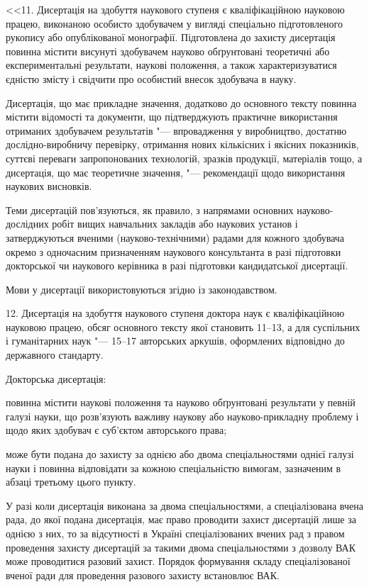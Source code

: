 \documentclass[
]{mon2017dev-aref}[2019/11/16]
\theoremstyle{plain}
\theoremstyle{definition}
\theoremstyle{remark}
\begin{document}
<<11. Дисертація на здобуття наукового ступеня є кваліфікаційною
науковою працею, виконаною особисто здобувачем у вигляді
спеціально підготовленого рукопису або опублікованої монографії.
Підготовлена до захисту дисертація повинна містити висунуті
здобувачем науково обґрунтовані теоретичні або експериментальні
результати, наукові положення, а також характеризуватися єдністю
змісту і свідчити про особистий внесок здобувача в науку.

Дисертація, що має прикладне значення, додатково до основного
тексту повинна містити відомості та документи, що підтверджують
практичне використання отриманих здобувачем результатів "---
впровадження у виробництво, достатню дослідно-виробничу перевірку,
отримання нових кількісних і якісних показників, суттєві переваги
запропонованих технологій, зразків продукції, матеріалів тощо, а
дисертація, що має теоретичне значення, "--- рекомендації щодо
використання наукових висновків.

Теми дисертацій пов'язуються, як правило, з напрямами основних
науково-дослідних робіт вищих навчальних закладів або наукових
установ і затверджуються вченими (науково-технічними) радами для
кожного здобувача окремо з одночасним призначенням наукового
консультанта в разі підготовки докторської чи наукового керівника
в разі підготовки кандидатської дисертації.

Мови у дисертації використовуються згідно із законодавством.

12. Дисертація на здобуття наукового ступеня доктора наук є
кваліфікаційною науковою працею, обсяг основного тексту якої
становить 11--13, а для суспільних і гуманітарних наук "--- 15--17
авторських аркушів, оформлених відповідно до державного стандарту.

Докторська дисертація:

повинна містити наукові положення та науково обґрунтовані
результати у певній галузі науки, що розв'язують важливу наукову
або науково-прикладну проблему і щодо яких здобувач є суб'єктом
авторського права;

може бути подана до захисту за однією або двома спеціальностями
однієї галузі науки і повинна відповідати за кожною спеціальністю
вимогам, зазначеним в абзаці третьому цього пункту.

У разі коли дисертація виконана за двома спеціальностями, а
спеціалізована вчена рада, до якої подана дисертація, має право
проводити захист дисертацій лише за однією з них, то за
відсутності в Україні спеціалізованих вчених рад з правом
проведення захисту дисертацій за такими двома спеціальностями з
дозволу ВАК може проводитися разовий захист. Порядок формування
складу спеціалізованої вченої ради для проведення разового захисту
встановлює ВАК.
\end{document}
